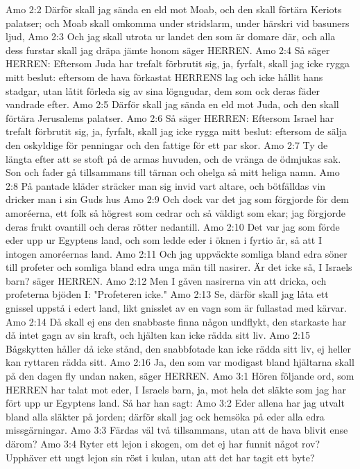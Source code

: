 Amo 2:2  Därför skall jag sända en eld mot Moab, och den skall förtära Keriots palatser; och Moab skall omkomma under stridslarm, under härskri vid basuners ljud,
Amo 2:3  Och jag skall utrota ur landet den som är domare där, och alla dess furstar skall jag dräpa jämte honom säger HERREN.
Amo 2:4  Så säger HERREN: Eftersom Juda har trefalt förbrutit sig, ja, fyrfalt, skall jag icke rygga mitt beslut: eftersom de hava förkastat HERRENS lag och icke hållit hans stadgar, utan låtit förleda sig av sina lögngudar, dem som ock deras fäder vandrade efter.
Amo 2:5  Därför skall jag sända en eld mot Juda, och den skall förtära Jerusalems palatser.
Amo 2:6  Så säger HERREN: Eftersom Israel har trefalt förbrutit sig, ja, fyrfalt, skall jag icke rygga mitt beslut: eftersom de sälja den oskyldige för penningar och den fattige för ett par skor.
Amo 2:7  Ty de längta efter att se stoft på de armas huvuden, och de vränga de ödmjukas sak. Son och fader gå tillsammans till tärnan och ohelga så mitt heliga namn.
Amo 2:8  På pantade kläder sträcker man sig invid vart altare, och bötfälldas vin dricker man i sin Guds hus
Amo 2:9  Och dock var det jag som förgjorde för dem amoréerna, ett folk så högrest som cedrar och så väldigt som ekar; jag förgjorde deras frukt ovantill och deras rötter nedantill.
Amo 2:10  Det var jag som förde eder upp ur Egyptens land, och som ledde eder i öknen i fyrtio år, så att I intogen amoréernas land.
Amo 2:11  Och jag uppväckte somliga bland edra söner till profeter och somliga bland edra unga män till nasirer. Är det icke så, I Israels barn? säger HERREN.
Amo 2:12  Men I gåven nasirerna vin att dricka, och profeterna bjöden I: "Profeteren icke."
Amo 2:13  Se, därför skall jag låta ett gnissel uppstå i edert land, likt gnisslet av en vagn som är fullastad med kärvar.
Amo 2:14  Då skall ej ens den snabbaste finna någon undflykt, den starkaste har då intet gagn av sin kraft, och hjälten kan icke rädda sitt liv.
Amo 2:15  Bågskytten håller då icke stånd, den snabbfotade kan icke rädda sitt liv, ej heller kan ryttaren rädda sitt.
Amo 2:16  Ja, den som var modigast bland hjältarna skall på den dagen fly undan naken, säger HERREN.
Amo 3:1  Hören följande ord, som HERREN har talat mot eder, I Israels barn, ja, mot hela det släkte som jag har fört upp ur Egyptens land. Så har han sagt:
Amo 3:2  Eder allena har jag utvalt bland alla släkter på jorden; därför skall jag ock hemsöka på eder alla edra missgärningar.
Amo 3:3  Färdas väl två tillsammans, utan att de hava blivit ense därom?
Amo 3:4  Ryter ett lejon i skogen, om det ej har funnit något rov? Upphäver ett ungt lejon sin röst i kulan, utan att det har tagit ett byte?
